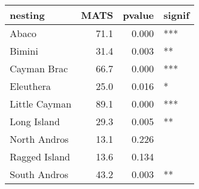 
\begin{tabular}{lrrl}
\toprule
nesting & MATS & pvalue & signif\\
\midrule
Abaco & 71.1 & 0.000 & ***\\
Bimini & 31.4 & 0.003 & **\\
Cayman Brac & 66.7 & 0.000 & ***\\
Eleuthera & 25.0 & 0.016 & *\\
Little Cayman & 89.1 & 0.000 & ***\\
\addlinespace
Long Island & 29.3 & 0.005 & **\\
North Andros & 13.1 & 0.226 & \\
Ragged Island & 13.6 & 0.134 & \\
South Andros & 43.2 & 0.003 & **\\
\bottomrule
\end{tabular}
